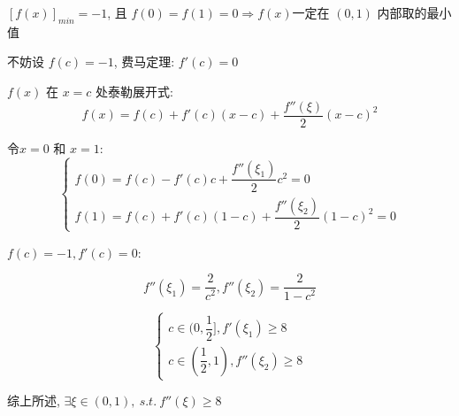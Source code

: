\begin{anymark}[泰勒展开]
	$[f(x)]_{min}=-1$, 且 $f(0)=f(1)=0 \Rightarrow f(x)$一定在 $(0,1)$ 内部取的最小值
	
	不妨设 $f(c)=-1$, 费马定理: $f'(c)=0$

	$f(x)$ 在 $x=c$ 处泰勒展开式:
	$$f(x)=f(c)+f'(c)(x-c)+\dfrac{f''(\xi)}{2}(x-c)^2$$

	令$x=0$ 和 $x=1$:
	$$\begin{cases}
		f(0) = f(c)-f'(c)c+\dfrac{f''(\xi_{1})}{2}c^2=0 \\
		f(1) = f(c)+f'(c)(1-c)+\dfrac{f''(\xi_{2})}{2}(1-c)^2=0
	\end{cases}$$

	$f(c)=-1,f'(c)=0$:

	$$f''(\xi_{1})=\dfrac{2}{c^2}, f''(\xi_{2})=\dfrac{2}{1-c^2}$$

	$$\begin{cases}
		c\in(0,\dfrac{1}{2}],f'(\xi_{1})\geq 8\\
		c\in(\dfrac{1}{2},1),f''(\xi_{2})\geq 8
	\end{cases}$$

	综上所述, $\exists \xi\in(0,1), \ s.t.\ f''(\xi)\geq 8$
\end{anymark}

